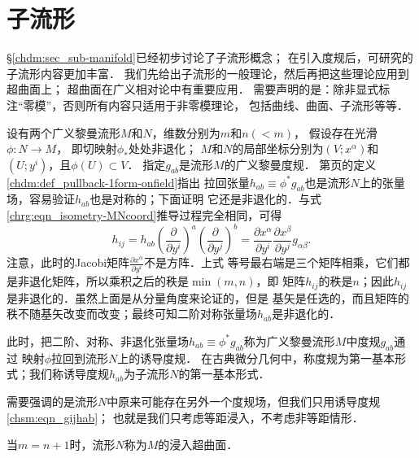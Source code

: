 
\chapter{子流形}\label{chsm}
\S \ref{chdm:sec_sub-manifold}已经初步讨论了子流形概念；
在引入度规后，可研究的子流形内容更加丰富．
我们先给出子流形的一般理论，然后再把这些理论应用到超曲面上；
超曲面在广义相对论中有重要应用．
需要声明的是：除非显式标注“零模”，否则所有内容只适用于非零模理论，
包括曲线、曲面、子流形等等．


设有两个广义黎曼流形$M$和$N$，维数分别为$m$和$n(<m)$，
假设存在光滑$\phi:N\to M$，%
即切映射$\phi_{*}$处处非退化；
$M$和$N$的局部坐标分别为$(V;x^\alpha)$和$(U;y^i)$，且$\phi(U)\subset V$．
指定$g_{ab}$是流形$M$的广义黎曼度规．
第\pageref{chdm:def_pullback-1form-onfield}页的定义\ref{chdm:def_pullback-1form-onfield}指出
拉回张量$h_{ab}\equiv\phi^{*}g_{ab}$也是流形$N$上的张量场，容易验证$h_{ab}$也是对称的；下面证明
它还是非退化的．与式\eqref{chrg:eqn_isometry-MNcoord}推导过程完全相同，可得
\begin{equation}\label{chsm:eqn_gijhab}
    h_{ij}= h_{ab} \left(\frac{\partial }{\partial y^i}\right)^a
    \left(\frac{\partial }{\partial y^j}\right)^b = \frac{\partial x^\alpha}{\partial y^i}
    \frac{\partial x^\beta}{\partial y^j} g_{\alpha\beta} .
\end{equation}
注意，此时的Jacobi矩阵$\frac{\partial x^\alpha}{\partial y^i}$不是方阵．上式
等号最右端是三个矩阵相乘，它们都是非退化矩阵，所以乘积之后的秩是$\min(m,n)$，即
矩阵$h_{ij}$的秩是$n$；因此$h_{ij}$是非退化的．虽然上面是从分量角度来论证的，但是
基矢是任选的，而且矩阵的秩不随基矢改变而改变；最终可知二阶对称张量场$h_{ab}$是非退化的．

此时，把二阶、对称、非退化张量场$h_{ab}\equiv\phi^{*}g_{ab}$称为广义黎曼流形$M$中度规$g_{ab}$通过
映射$\phi$拉回到流形$N$上的{\heiti 诱导度规}．
在古典微分几何中，称度规为第一基本形式；我们称诱导度规$h_{ab}$为子流形$N$的{\heiti 第一基本形式}．

需要强调的是流形$N$中原来可能存在另外一个度规场，但我们只用诱导度规\eqref{chsm:eqn_gijhab}；
也就是我们只考虑等距浸入，不考虑非等距情形．

当$m=n+1$时，流形$N$称为$M$的浸入超曲面．





